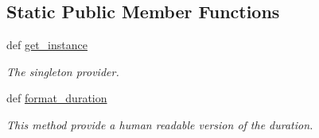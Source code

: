 \subsection*{Static Public Member Functions}
\begin{DoxyCompactItemize}
\item 
\hypertarget{classsrc_1_1fr_1_1tagc_1_1rainet_1_1core_1_1util_1_1time_1_1Timer_1_1Timer_ac52dc337b386800cda99d09908bf99db}{def \hyperlink{classsrc_1_1fr_1_1tagc_1_1rainet_1_1core_1_1util_1_1time_1_1Timer_1_1Timer_ac52dc337b386800cda99d09908bf99db}{get\-\_\-instance}}\label{classsrc_1_1fr_1_1tagc_1_1rainet_1_1core_1_1util_1_1time_1_1Timer_1_1Timer_ac52dc337b386800cda99d09908bf99db}

\begin{DoxyCompactList}\small\item\em The singleton provider. \end{DoxyCompactList}\item 
\hypertarget{classsrc_1_1fr_1_1tagc_1_1rainet_1_1core_1_1util_1_1time_1_1Timer_1_1Timer_a5606e594ce51207814adcf37824e936b}{def \hyperlink{classsrc_1_1fr_1_1tagc_1_1rainet_1_1core_1_1util_1_1time_1_1Timer_1_1Timer_a5606e594ce51207814adcf37824e936b}{format\-\_\-duration}}\label{classsrc_1_1fr_1_1tagc_1_1rainet_1_1core_1_1util_1_1time_1_1Timer_1_1Timer_a5606e594ce51207814adcf37824e936b}

\begin{DoxyCompactList}\small\item\em This method provide a human readable version of the duration. \end{DoxyCompactList}\end{DoxyCompactItemize}
